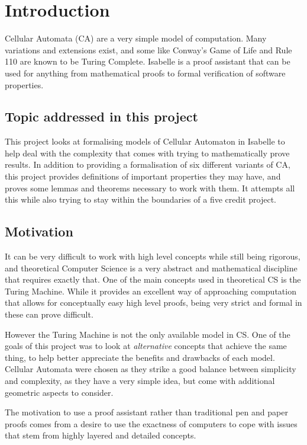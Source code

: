\chapter{Introduction}
Cellular Automata (CA) are a very simple model of computation.
Many variations and extensions exist,
and some like Conway's Game of Life and Rule 110 are known to be Turing Complete.
Isabelle is a proof assistant that can be used for anything from mathematical proofs to formal verification of software properties.


\section{Topic addressed in this project}

This project looks at formalising models of Cellular Automaton in Isabelle to help deal with the complexity that comes with trying to mathematically prove results.
In addition to providing a formalisation of six different variants of CA,
this project provides definitions of important properties they may have, and proves some lemmas and theorems necessary to work with them.
It attempts all this while also trying to stay within the boundaries of a five credit project.


\section{Motivation}

It can be very difficult to work with high level concepts while still being rigorous,
and theoretical Computer Science is a very abstract and mathematical discipline that requires exactly that.
One of the main concepts used in theoretical CS is the Turing Machine.
While it provides an excellent way of approaching computation that allows for conceptually easy high level proofs,
being very strict and formal in these can prove difficult.

However the Turing Machine is not the only available model in CS.
One of the goals of this project was to look at \emph{alternative} concepts that achieve the same thing,
to help better appreciate the benefits and drawbacks of each model.
Cellular Automata were chosen as they strike a good balance between simplicity and complexity,
as they have a very simple idea, 
but come with additional geometric aspects to consider.

The motivation to use a proof assistant rather than traditional pen and paper proofs
comes from a desire to use the exactness of computers to cope with issues that stem from highly layered and detailed concepts.


